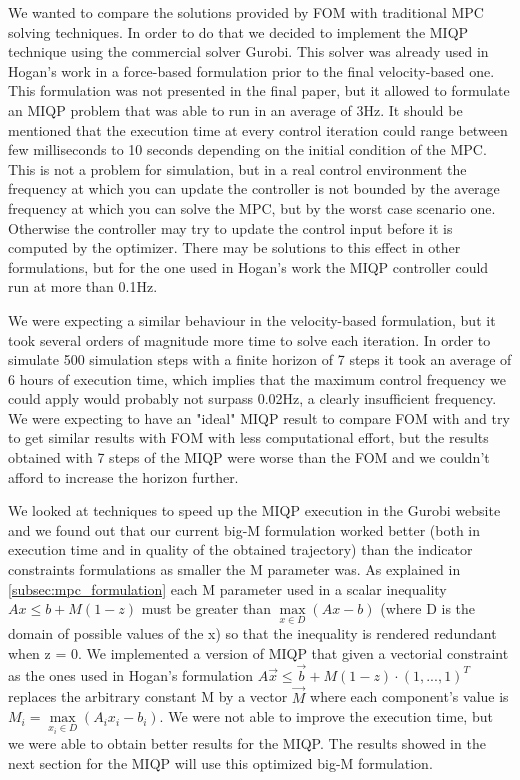 \documentclass[12,twoside]{TFG-GM}
\theoremstyle{definition}
\theoremstyle{remark}
\begin{document}
We wanted to compare the solutions provided by FOM with traditional MPC solving techniques. In order to do that we decided to implement the MIQP technique using the commercial solver Gurobi. This solver was already used in Hogan's work in a force-based formulation prior to the final velocity-based one. This formulation was not presented in the final paper, but it allowed to formulate an MIQP problem that was able to run in an average of 3Hz. It should be mentioned that the execution time at every control iteration could range between few milliseconds to 10 seconds depending on the initial condition of the MPC.
This is not a problem for simulation, but in a real control environment the frequency at which you can update the controller is not bounded by the average frequency at which you can solve the MPC, but by the worst case scenario one. Otherwise the controller may try to update the control input before it is computed by the optimizer. There may be solutions to this effect in other formulations, but for the one used in Hogan's work the MIQP controller could run at more than 0.1Hz.

We were expecting a similar behaviour in the velocity-based formulation, but it took several orders of magnitude more time to solve each iteration. In order to simulate 500 simulation steps with a finite horizon of 7 steps it took an average of 6 hours of execution time, which implies that the maximum control frequency we could apply would probably not surpass 0.02Hz, a clearly insufficient frequency. We were expecting to have an "ideal" MIQP result to compare FOM with and try to get similar results with FOM with less computational effort, but the results obtained with 7 steps of the MIQP were worse than the FOM and we couldn't afford to increase the horizon further.

We looked at techniques to speed up the MIQP execution in the Gurobi website and we found out that our current big-M formulation worked better (both in execution time and in quality of the obtained trajectory) than the indicator constraints formulations as smaller the M parameter was. As explained in \ref{subsec:mpc_formulation} each M parameter used in a scalar inequality $Ax \leq b + M (1 - z)$ must be greater than $\max\limits_{x \in D}{(Ax - b)}$ (where D is the domain of possible values of the x) so that the inequality is rendered redundant when z = 0. We implemented a version of MIQP that given a vectorial constraint as the ones used in Hogan's formulation $A\vec{x} \leq \vec{b} + M (1 - z) \cdot (1, ..., 1)^T$ replaces the arbitrary constant M by a vector $\vec{M}$ where each component's value is $M_i = \max\limits_{x_i \in D}{(A_i x_i - b_i)}$. We were not able to improve the execution time, but we were able to obtain better results for the MIQP. The results showed in the next section for the MIQP will use this optimized big-M formulation.
\end{document}
